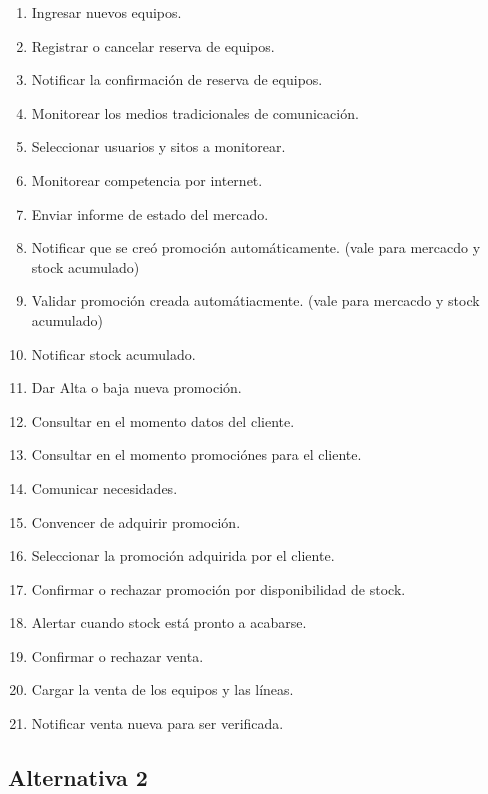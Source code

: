 \begin{enumerate}

  \item Ingresar nuevos equipos.
  \item Registrar o cancelar reserva de equipos.
  \item Notificar la confirmación de reserva de equipos.
  \item Monitorear los medios tradicionales de comunicación.
  \item Seleccionar usuarios y sitos a monitorear.
  \item Monitorear competencia por internet.
  \item Enviar informe de estado del mercado.
  \item Notificar que se creó promoción automáticamente. (vale para mercacdo y stock acumulado)
  \item Validar promoción creada automátiacmente. (vale para mercacdo y stock acumulado)
  \item Notificar stock acumulado.
  \item Dar Alta o baja nueva promoción.
  \item Consultar en el momento datos del cliente.
  \item Consultar en el momento promociónes para el cliente.
  \item Comunicar necesidades.
  \item Convencer de adquirir promoción.
  \item Seleccionar la promoción adquirida por el cliente.
  \item Confirmar o rechazar promoción por disponibilidad de stock.
  \item Alertar cuando stock está pronto a acabarse.
  \item Confirmar o rechazar venta.
  \item Cargar la venta de los equipos y las líneas.
  \item Notificar venta nueva para ser verificada.

\end{enumerate}

\subsection{Alternativa 2}

